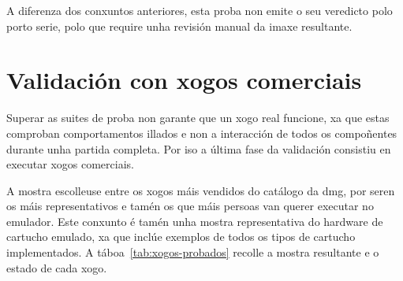 A diferenza dos conxuntos anteriores, esta proba non emite o seu veredicto polo porto serie,
polo que require unha revisión manual da imaxe resultante.


\section{Validación con xogos comerciais}
\label{sec:validacion_xogos}

Superar as suites de proba non garante que un xogo real funcione, xa que estas comproban comportamentos illados
e non a interacción de todos os compoñentes durante unha partida completa.
Por iso a última fase da validación consistiu en executar xogos comerciais.

A mostra escolleuse entre os xogos máis vendidos do catálogo da \acrshort{dmg},
por seren os máis representativos e tamén os que máis persoas van querer executar no emulador.
Este conxunto é tamén unha mostra representativa do hardware de cartucho emulado,
xa que inclúe exemplos de todos os tipos de cartucho implementados.
A táboa~\ref{tab:xogos-probados} recolle a mostra resultante e o estado de cada xogo.

\begin{table}[htbp]
  \centering
  \caption{Xogos máis vendidos do catálogo da \acrshort{dmg}, ordenados por vendas, empregados para probar cada controlador.}
  \label{tab:xogos-probados}
\end{table}

